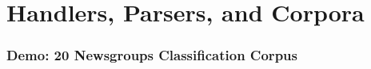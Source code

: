 \chapter{Handlers, Parsers, and Corpora}\label{chapter:corpus}

\subsection{Demo: 20 Newsgroups Classification Corpus}\label{section:20-news-corpus}

